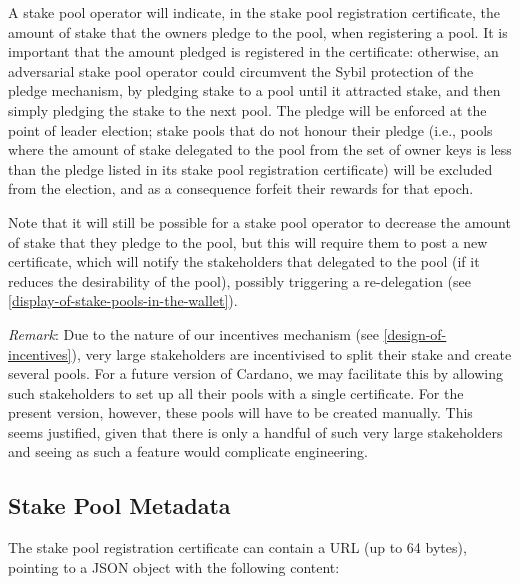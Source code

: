 \documentclass[11pt,a4paper,dvipsnames,twosided]{article}
\begin{document}
A stake pool operator will indicate, in the stake pool registration
certificate, the amount of stake that the owners pledge to
the pool, when registering a pool. It is important that the amount
pledged is registered in the certificate: otherwise,
an adversarial stake pool operator could circumvent the Sybil protection
of the pledge mechanism, by pledging stake to a pool until it attracted stake,
and then simply pledging the stake to the next pool. The pledge will be
enforced at the point of leader election; stake pools that do not
honour their pledge (i.e., pools where the amount of stake delegated
to the pool from the set of owner keys is less than the pledge listed
in its stake pool registration certificate) will be excluded from the election,
and as a consequence forfeit their rewards for that epoch.

Note that it will still be possible for a stake pool operator to decrease the
amount of stake that they pledge to the pool, but this will require them to post
a new certificate, which will notify the stakeholders that delegated to the pool
(if it reduces the desirability of the pool), possibly triggering a
re-delegation (see \cref{display-of-stake-pools-in-the-wallet}).

\emph{Remark}: Due to the nature of our incentives mechanism (see
\cref{design-of-incentives}), very large stakeholders are
incentivised to split their stake and create several pools. For a future
version of Cardano, we may facilitate this by allowing such
stakeholders to set up all their pools with a single certificate. For
the present version, however, these pools will have to be created
manually. This seems justified, given that there is only a handful of
such very large stakeholders and seeing as such a feature would
complicate engineering.

\subsection{Stake Pool Metadata}
\label{stake-pool-metadata}

The stake pool registration certificate can contain a URL (up to 64 bytes),
pointing to a JSON object with the following content:
\end{document}
